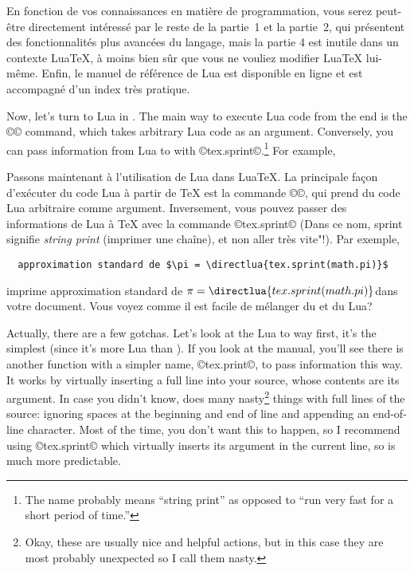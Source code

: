 \documentclass{lltxdoc}
\begin{document}
En fonction de vos connaissances en matière de programmation, vous serez peut-être directement intéressé par le reste de la partie~1 et la partie~2, qui présentent des fonctionnalités plus avancées du langage, mais la partie 4 est inutile dans un contexte LuaTeX, à moins bien sûr que vous ne vouliez modifier LuaTeX lui-même. Enfin, le manuel de référence de Lua est disponible en ligne et est accompagné d'un index très pratique.

\medskip

Now, let's turn to Lua in \luatex. The main way to execute Lua code from the
\tex end is the ©\directlua© command, which takes arbitrary Lua code as an
argument. Conversely, you can pass information from Lua to \tex with
©tex.sprint©.\footnote{The name probably means ``string print'' as opposed to
  ``run very fast for a short period of time.''} For example,

Passons maintenant à l'utilisation de Lua dans LuaTeX. La principale façon d'exécuter du code Lua à partir de TeX est la commande ©\directlua©, qui prend du code Lua arbitraire comme argument. Inversement, vous pouvez passer des informations de Lua à TeX avec la commande ©tex.sprint© (Dans ce nom, \og{}sprint\gf{} signifie \og{}\emph{string print}\fg{} (\og{}imprimer une chaîne\fg{}), et non \og{}aller très vite"\fg{}!). Par exemple,
\begin{Verbatim}
  approximation standard de $\pi = \directlua{tex.sprint(math.pi)}$
\end{Verbatim}
imprime \og{}approximation standard de $\pi = \directlua{tex.sprint(math.pi)}$\fg dans votre document. Vous voyez comme il est facile de mélanger du \tex et du Lua?

Actually, there are a few gotchas. Let's look at the Lua to \tex way first,
it's the simplest (since it's more Lua than \tex). If you look at the \luatex
manual, you'll see there is another function with a simpler name, ©tex.print©,
to pass information this way. It works by virtually inserting a full line into
your \tex source, whose contents are its argument. In case you didn't know,
\tex does many nasty\footnote{Okay, these are usually nice and helpful
  actions, but in this case they are most probably unexpected so I call them
  nasty.} things with full lines of the source:
ignoring spaces at the beginning and end of line and appending an end-of-line
character. Most of the time, you don't want this to happen, so I recommend
using ©tex.sprint© which virtually inserts its argument in the current line,
so is much more predictable.
\end{document}
